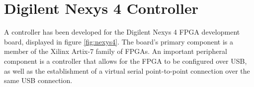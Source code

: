 \documentclass[main.tex]{subfiles}
\begin{document}





\section{Digilent Nexys 4 Controller}
A controller has been developed for the Digilent Nexys 4 FPGA development board, displayed in figure \ref{fig:nexys4}. The board's primary component is a member of the Xilinx Artix-7 family of FPGAs. An important peripheral component is a controller that allows for the FPGA to be configured over USB, as well as the establishment of a virtual serial point-to-point connection over the same USB connection.
\end{document}
